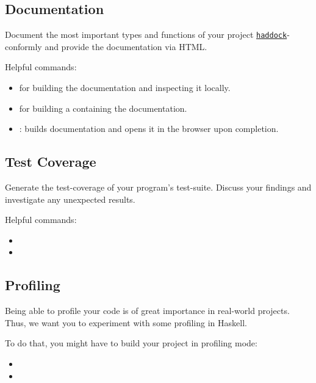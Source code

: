 \documentclass{article}
\begin{document}
\subsection{Documentation}

Document the most important types and functions of your project \href{https://haskell-haddock.readthedocs.io/en/latest/markup.html}{\texttt{haddock}}-conformly and provide the documentation via HTML.

Helpful commands:

\begin{itemize}
\item {} for building the documentation and inspecting it locally.
\item {} for building a  containing the documentation.
\item {}: builds documentation and opens it in the browser upon completion.
\end{itemize}

\subsection{Test Coverage}

Generate the test-coverage of your program's test-suite.
Discuss your findings and investigate any unexpected results.

Helpful commands:

\begin{itemize}
\item {}
\item {}
\end{itemize}

\subsection{Profiling}

Being able to profile your code is of great importance in real-world projects. Thus, we want you to experiment with some profiling in Haskell.

To do that, you might have to build your project in profiling mode:

\begin{itemize}
\item {}
\item {}
\end{itemize}
\end{document}
